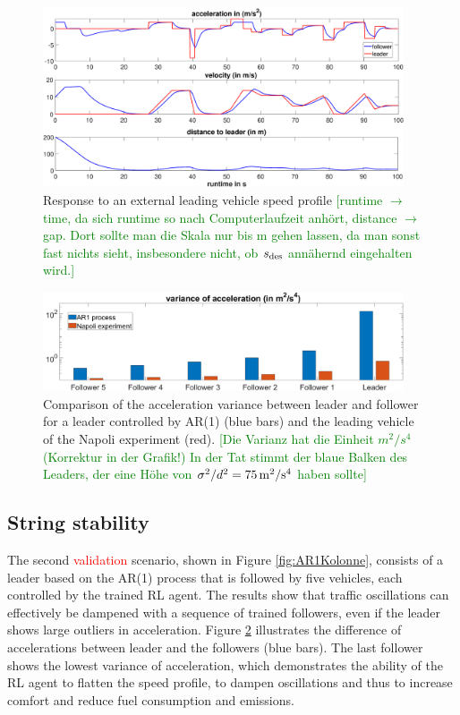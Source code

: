 \documentclass[review]{elsarticle}
\providecommand{\red}[1]{\textcolor{red}{#1}}
\providecommand{\green}[1]{\textcolor{green}{#1}}
\providecommand{\martin}[1]{\red{#1}} %
\providecommand{\martinc}[1]{\green{[#1]}} %
\providecommand{\sub}[1]{_{\text{{\scriptsize \hspace{-0.0ex}#1}}}}
\providecommand{\3}{{\ss}}
\begin{document}
\begin{figure}
	\centering
	\includegraphics[width=0.95\textwidth]{images/manipulatedLeader.eps}
	\caption{Response to an external leading vehicle speed profile
\martinc{runtime $\to$ time, da sich runtime so nach Computerlaufzeit
  anh\"ort, distance $\to$ gap. Dort sollte man die Skala nur bis
  \unit[50]{m} gehen lassen, da man sonst fast nichts sieht,
  insbesondere nicht, ob $s\sub{des}$ ann\"ahernd eingehalten wird.} }
	\label{fig:manipulatedLeader}
\end{figure}

\begin{figure}
	\centering
	\includegraphics[width=0.95\textwidth]{images/VarAccComp}
	\caption{Comparison of the acceleration variance between
          leader and follower for a leader controlled by AR(1) (blue
          bars) and the leading vehicle of the Napoli experiment
          (red).
\martinc{Die Varianz hat die Einheit $\unit{m^2/s^4}$ (Korrektur in der
Grafik!) In der Tat stimmt der blaue Balken des Leaders, der eine
H\"ohe von $\sigma^2/d^2=\unit[75]{m^2/s^4}$ haben sollte}}
	\label{fig:VarAccComp}
\end{figure}






\subsection{String stability}
\label{sec:stringStability}
The second \martin{validation} scenario, shown in Figure
\ref{fig:AR1Kolonne}, consists of a leader based on the AR(1) process
that is
followed by five vehicles, each controlled by the trained RL
agent. The results show that traffic oscillations can effectively be
dampened with a sequence of trained followers, even if the leader
shows large outliers in acceleration. Figure \ref{fig:VarAccComp}
illustrates the difference of accelerations between leader and the
followers (blue bars). The last follower shows the lowest variance of
acceleration, which demonstrates the ability of the RL agent to
flatten the speed profile, to dampen oscillations and thus to increase
comfort and reduce fuel consumption and emissions.   
\end{document}
